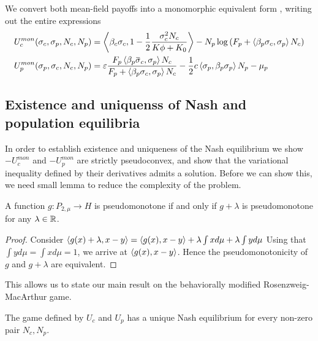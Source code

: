 We convert both mean-field payoffs into a monomorphic equivalent form , writing out the entire expressions
\begin{align}
  \label{eq:mon_eq_forms}
  U_c^{mon}(\sigma_c, \sigma_p, N_c, N_p) &= \ip{\beta_c \sigma_c}{1-\frac{1}{2}\frac{\sigma_c^2 N_c}{K\phi + K_0}} - N_p\log\pa{F_p + \ip{\beta_p \sigma_c}{\sigma_p} N_c} \\
  U_p^{mon}(\sigma_p, \sigma_c, N_c, N_p) &= \epsilon \frac{F_p \ip{\beta_p \overbar{\sigma}_c}{\sigma_p} N_c}{F_p + \ip{\beta_p \sigma_c}{\sigma_p} N_c} - \frac{1}{2}c \ip{\sigma_p}{\beta_p \sigma_p}N_p  - \mu_p
\end{align}
\subsection{Existence and uniquenss of Nash and population equilibria}
In order to establish existence and uniqueness of the Nash equilibrium we show $-U_c^{mon}$ and $-U_p^{mon}$ are strictly pseudoconvex, and show that the variational inequality defined by their derivatives admits a solution. Before we can show this, we need small lemma to reduce the complexity of the problem.
\begin{lemma}
  \label{lem:pseudo_reduc}
  A function $g: P_{2,\mu} \to H$ is pseudomonotone if and only if $g+\lambda$ is pseudomonotone for any $\lambda \in \mathbb{R}$.
\end{lemma}
\begin{proof}
  Consider $\left \langle g(x)+\lambda,x-y \right \rangle=\left \langle g(x),x-y \right \rangle+\lambda \int x d\mu + \lambda \int y d\mu$
  Using that $\int y d\mu = \int x d\mu = 1$, we arrive at  $\left \langle g(x),x-y \right \rangle$.
  Hence the pseudomonotonicity of $g$ and $g+\lambda$ are equivalent.
\end{proof}
This allows us to state our main result on the behaviorally modified Rosenzweig-MacArthur game.
\begin{proposition}
  \label{prop:exist_unique_nash}
  The game defined by $U_c$ and $U_p$ has a unique Nash equilibrium for every non-zero pair $N_c,N_p$.
\end{proposition}
